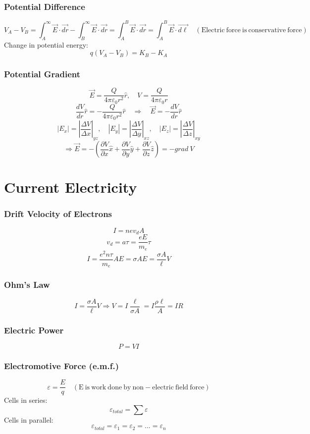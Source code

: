 \documentclass{article}
\begin{document}
\subsubsection*{Potential Difference}
\[V_A-V_B=\int_A^\infty\vec{E}\cdot\vec{dr}-\int_B^\infty\vec{E}\cdot\vec{dr}=\int_A^B\vec{E}\cdot\vec{dr}=\int_A^B\vec{E}\cdot\vec{d\ell}\quad(\mathrm{Electric\ force\ is\ conservative\ force})\]
Change in potential energy:
\[q(V_A-V_B)=K_B-K_A\]

\subsubsection*{Potential Gradient}
\[\vec{E}=\frac{Q}{4\pi\varepsilon_0r^2}\hat{r},\quad V=\frac{Q}{4\pi\varepsilon_0r}\]
\[\frac{dV}{dr}\hat{r}=-\frac{Q}{4\pi\varepsilon_0r^2}\hat{r}\quad\Rightarrow\quad\vec{E}=-\frac{dV}{dr}\hat{r}\]
\[\left|E_x\right|=\left|{\frac{\Delta V}{\Delta x}}\right|_{yz},\quad\left|E_y\right|=\left|{\frac{\Delta V}{\Delta y}}\right|_{xz},\quad\left|E_z\right|=\left|{\frac{\Delta V}{\Delta z}}\right|_{xy}\]
\[\Rightarrow\vec{E}=-(\frac{\partial V}{\partial x}\hat{x}+\frac{\partial V}{\partial y}\hat{y}+\frac{\partial V}{\partial z}\hat{z})=-grad\ V\]

\section{Current Electricity}
\subsubsection*{Drift Velocity of Electrons}
\[I=nev_dA\]
\[v_d=a\tau=\frac{eE}{m_e}\tau\]
\[I=\frac{e^2n\tau}{m_e}AE=\sigma AE=\frac{\sigma A}{\ell}V\]

\subsubsection*{Ohm's Law}
\[I=\frac{\sigma A}{\ell}V \Rightarrow V=I\frac{\ell}{\sigma A}=I\frac{\rho \ell}{A}=IR\]

\subsubsection*{Electric Power}
\[P=VI\]

\subsubsection*{Electromotive Force (e.m.f.)}
\[\varepsilon=\frac{E}{q}\quad (\mathrm{E\ is\ work\ done\ by\ non-electric\ field\ force})\]
Cells in series:
\[\varepsilon_{total}=\sum\varepsilon\]
Cells in parallel:
\[\varepsilon_{total}=\varepsilon_1=\varepsilon_2=...=\varepsilon_n\]
\end{document}
